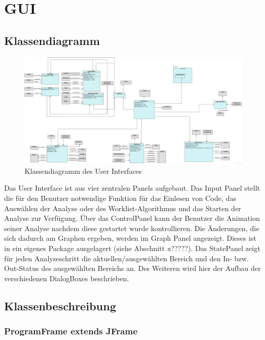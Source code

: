 \section{GUI}

\subsection{Klassendiagramm}

\begin{figure}[htbp] 
  \centering
  		 \includegraphics[width=1\textwidth]{Klassenuebersicht/GUI/GUI}
  \caption{Klassendiagramm des User Interfaces}
  \label{fig:UI}
\end{figure}

Das User Interface ist aus vier zentralen Panels aufgebaut. 
Das Input Panel stellt die für den Benutzer notwendige Funktion für das Einlesen von Code, das Auswählen der Analyse oder des Worklist-Algorithmus und das Starten der Analyse zur Verfügung. 
Über das ControlPanel kann der Benutzer die Animation seiner Analyse nachdem diese gestartet wurde kontrollieren. 
Die Änderungen, die sich dadurch am Graphen ergeben, werden im Graph Panel angezeigt. 
Dieses ist in ein eigenes Package ausgelagert (siehe Abschnitt x?????). 
Das StatePanel zeigt für jeden Analyseschritt die aktuellen/ausgewählten Bereich und den In- bzw. Out-Status des ausgewählten Bereichs an. 
Des Weiteren wird hier der Aufbau der verschiedenen DialogBoxes beschrieben.

\subsection{Klassenbeschreibung}

\subsubsection{ProgramFrame extends JFrame}


